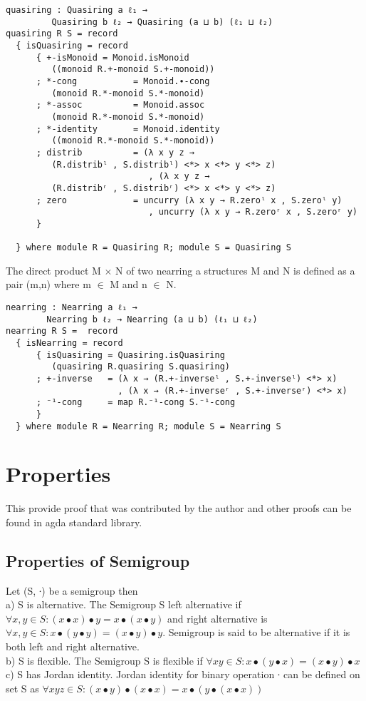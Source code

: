 \begin{Verbatim}
quasiring : Quasiring a ℓ₁ →
		 Quasiring b ℓ₂ → Quasiring (a ⊔ b) (ℓ₁ ⊔ ℓ₂)
quasiring R S = record
  { isQuasiring = record
      { +-isMonoid = Monoid.isMonoid
		 ((monoid R.+-monoid S.+-monoid))
      ; *-cong           = Monoid.∙-cong
		 (monoid R.*-monoid S.*-monoid)
      ; *-assoc          = Monoid.assoc
		 (monoid R.*-monoid S.*-monoid)
      ; *-identity       = Monoid.identity
		 ((monoid R.*-monoid S.*-monoid))
      ; distrib          = (λ x y z →
		 (R.distribˡ , S.distribˡ) <*> x <*> y <*> z)
                            , (λ x y z →
		 (R.distribʳ , S.distribʳ) <*> x <*> y <*> z)
      ; zero             = uncurry (λ x y → R.zeroˡ x , S.zeroˡ y)
                            , uncurry (λ x y → R.zeroʳ x , S.zeroʳ y)
      }

  } where module R = Quasiring R; module S = Quasiring S
\end{Verbatim}
The direct product M \(\times\) N of two nearring a structures M and N is defined as a pair (m,n) where m \(\in\) M and n \(\in\) N.
\begin{Verbatim}
nearring : Nearring a ℓ₁ → 
		Nearring b ℓ₂ → Nearring (a ⊔ b) (ℓ₁ ⊔ ℓ₂)
nearring R S =  record
  { isNearring = record
      { isQuasiring = Quasiring.isQuasiring
		 (quasiring R.quasiring S.quasiring)
      ; +-inverse   = (λ x → (R.+-inverseˡ , S.+-inverseˡ) <*> x)
                      , (λ x → (R.+-inverseʳ , S.+-inverseʳ) <*> x)
      ; ⁻¹-cong     = map R.⁻¹-cong S.⁻¹-cong
      }
  } where module R = Nearring R; module S = Nearring S
\end{Verbatim}
\section{Properties}

This provide proof that was contributed by the author and other proofs can be found in agda standard library.
\subsection{Properties of Semigroup}
Let (S, ∙) be a semigroup then\\
a) S is alternative. The Semigroup S left alternative if \( \forall x,y \in S : (x ∙ x) ∙ y = x ∙ (x ∙ y) \) and right alternative is \(\forall x,y \in S : x ∙ (y ∙ y) = (x ∙ y) ∙ y\). Semigroup is said to be alternative if it is both left and right alternative. \\
b) S is flexible. The Semigroup S is flexible if \(\forall x y \in S: x ∙ (y ∙ x) = (x ∙ y) ∙ x\)\\
c) S has Jordan identity.  Jordan identity for binary operation ∙ can be defined on set S as \( \forall x y z \in S: (x ∙ y) ∙ (x ∙ x) = x ∙ (y ∙ (x ∙ x)) \)\\

